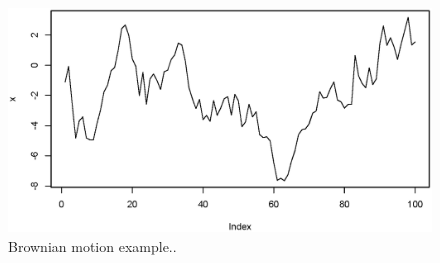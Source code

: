 \documentclass[11pt]{book}\usepackage[]{graphicx}\usepackage[]{color}
\makeatletter
\def\maxwidth{ %
  \ifdim\Gin@nat@width>\linewidth
    \linewidth
  \else
    \Gin@nat@width
  \fi
}
\newenvironment{knitrout}{}{} %
\newcommand{\fishname}{Arrowtooth Flounder}
\makeatother
\begin{document}

\begin{figure}[H]
\begin{center}
\begin{knitrout}
\color{fgcolor}
\includegraphics[width=\maxwidth]{knitr-cache/unnamed-chunk-4-1} 

\end{knitrout}
\end{center}
\caption{Brownian motion example..}
\label{fig:example-brownian-motion}
\end{figure}
\end{document}

